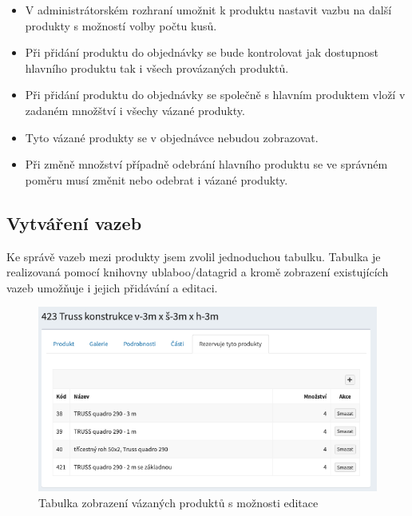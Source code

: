 \begin{itemize}
    \item V administrátorském rozhraní umožnit k produktu nastavit vazbu na další produkty s možností volby počtu kusů.
    \item Při přidání produktu do objednávky se bude kontrolovat jak dostupnost hlavního produktu tak i všech provázaných produktů.
    \item Při přidání produktu do objednávky se společně s hlavním produktem vloží v zadaném množštví i všechy vázané produkty.
    \item Tyto vázané produkty se v objednávce nebudou zobrazovat.
    \item Při změně množství případně odebrání hlavního produktu se ve správném poměru musí změnit nebo odebrat i vázané produkty.

\end{itemize}

\subsection{Vytváření vazeb}

Ke správě vazeb mezi produkty jsem zvolil jednoduchou tabulku. Tabulka je realizovaná pomocí knihovny ublaboo/datagrid \cite{contributteContributteDatagrid} a kromě zobrazení existujících vazeb umožňuje i jejich přidávání a editaci.

\begin{figure}
    \centering
    \includegraphics[width=0.75\linewidth]{vazane-produkty.png}
    \caption{Tabulka zobrazení vázaných produktů s možnosti editace}
    \label{fig:enter-label}
\end{figure}



